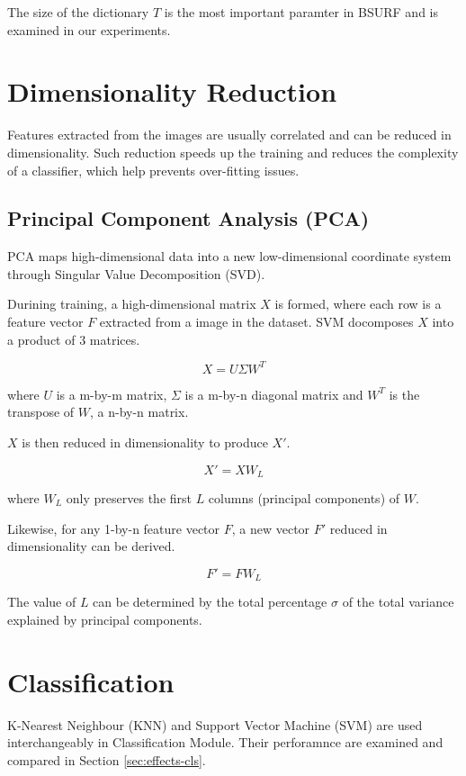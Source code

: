 The size of the dictionary $T$ is the most important paramter in BSURF and is examined in our experiments.



\section{Dimensionality Reduction}
Features extracted from the images are usually correlated and can be reduced in dimensionality.
Such reduction speeds up the training and reduces the complexity of a classifier, which help prevents over-fitting issues.

\subsection{Principal Component Analysis (PCA)}
PCA maps high-dimensional data into a new low-dimensional coordinate system through Singular Value Decomposition (SVD).

Durining training, a high-dimensional matrix $X$ is formed, where each row is a feature vector $F$ extracted from a image in the dataset.
SVM docomposes $X$ into a product of $3$ matrices.

\begin{equation}
X = U \Sigma W^T
\end{equation}

where $U$ is a m-by-m matrix, $\Sigma$ is a m-by-n diagonal matrix and $W^T$ is the transpose of $W$, a n-by-n matrix.

$X$ is then reduced in dimensionality to produce $X'$.

\begin{equation}
X' = X W_L
\end{equation}

where $W_L$ only preserves the first $L$ columns (principal components) of $W$.

Likewise, for any 1-by-n feature vector $F$, a new vector $F'$ reduced in dimensionality can be derived.

\begin{equation}
F' = F W_L
\end{equation}

The value of $L$ can be determined by the total percentage $\sigma$ of the total variance explained by principal components.

\section{Classification}
K-Nearest Neighbour (KNN) and Support Vector Machine (SVM) are used interchangeably in Classification Module. Their perforamnce are examined and compared in Section \ref{sec:effects-cls}.

